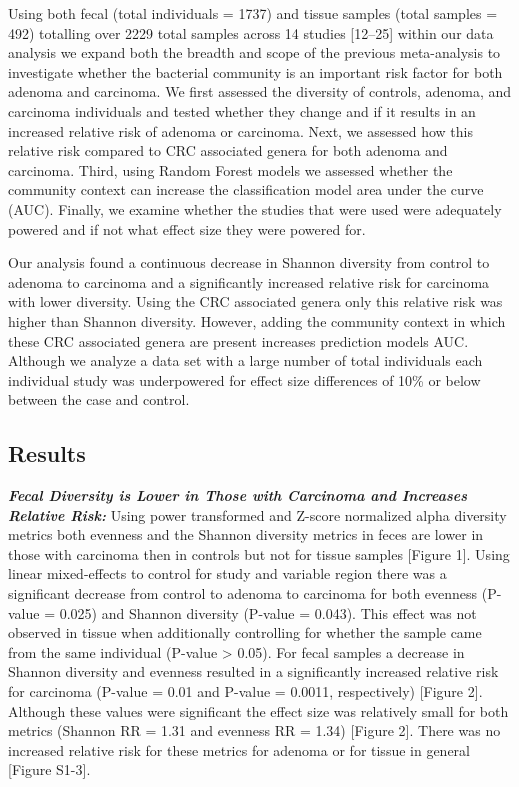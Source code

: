 \documentclass[12pt,]{article}
\begin{document}
Using both fecal (total individuals = 1737) and tissue samples (total
samples = 492) totalling over 2229 total samples across 14 studies
{[}12--25{]} within our data analysis we expand both the breadth and
scope of the previous meta-analysis to investigate whether the bacterial
community is an important risk factor for both adenoma and carcinoma. We
first assessed the diversity of controls, adenoma, and carcinoma
individuals and tested whether they change and if it results in an
increased relative risk of adenoma or carcinoma. Next, we assessed how
this relative risk compared to CRC associated genera for both adenoma
and carcinoma. Third, using Random Forest models we assessed whether the
community context can increase the classification model area under the
curve (AUC). Finally, we examine whether the studies that were used were
adequately powered and if not what effect size they were powered for.

Our analysis found a continuous decrease in Shannon diversity from
control to adenoma to carcinoma and a significantly increased relative
risk for carcinoma with lower diversity. Using the CRC associated genera
only this relative risk was higher than Shannon diversity. However,
adding the community context in which these CRC associated genera are
present increases prediction models AUC. Although we analyze a data set
with a large number of total individuals each individual study was
underpowered for effect size differences of 10\% or below between the
case and control.

\newpage

\subsection{Results}\label{results}

\textbf{\emph{Fecal Diversity is Lower in Those with Carcinoma and
Increases Relative Risk:}} Using power transformed and Z-score
normalized alpha diversity metrics both evenness and the Shannon
diversity metrics in feces are lower in those with carcinoma then in
controls but not for tissue samples {[}Figure 1{]}. Using linear
mixed-effects to control for study and variable region there was a
significant decrease from control to adenoma to carcinoma for both
evenness (P-value = 0.025) and Shannon diversity (P-value = 0.043). This
effect was not observed in tissue when additionally controlling for
whether the sample came from the same individual (P-value \textgreater{}
0.05). For fecal samples a decrease in Shannon diversity and evenness
resulted in a significantly increased relative risk for carcinoma
(P-value = 0.01 and P-value = 0.0011, respectively) {[}Figure 2{]}.
Although these values were significant the effect size was relatively
small for both metrics (Shannon RR = 1.31 and evenness RR = 1.34)
{[}Figure 2{]}. There was no increased relative risk for these metrics
for adenoma or for tissue in general {[}Figure S1-3{]}.
\end{document}
